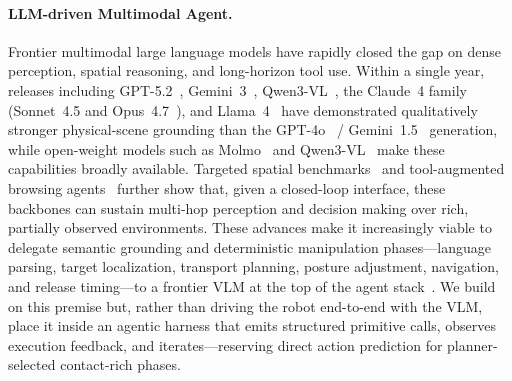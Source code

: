 \documentclass{article}
\begin{document}
	\paragraph{LLM-driven Multimodal Agent.} Frontier multimodal large language models have rapidly closed the gap on dense perception, spatial reasoning, and long-horizon tool use. Within a single year, releases including GPT-5.2~\citep{openai2025gpt52}, Gemini~3~\citep{pichai2025gemini3}, Qwen3-VL~\citep{bai2025qwen3vltechnicalreport}, the Claude~4 family (Sonnet~4.5 and Opus~4.7~\citep{anthropic2025claudesonnet45}), and Llama~4~\citep{llama4} have demonstrated qualitatively stronger physical-scene grounding than the GPT-4o~\citep{openai2024gpt4ocard} / Gemini~1.5~\citep{team2023gemini} generation, while open-weight models such as Molmo~\citep{deitke2025molmo} and Qwen3-VL~\citep{bai2025qwen3vltechnicalreport} make these capabilities broadly available. Targeted spatial benchmarks~\citep{chen2024spatialvlm} and tool-augmented browsing agents~\citep{oaidr, geminidr, wu2025mmsearchr1, geng2025webwatcher, huang2026vision, jin2025search, li2025websailor} further show that, given a closed-loop interface, these backbones can sustain multi-hop perception and decision making over rich, partially observed environments. These advances make it increasingly viable to delegate semantic grounding and deterministic manipulation phases---language parsing, target localization, transport planning, posture adjustment, navigation, and release timing---to a frontier VLM at the top of the agent stack~\citep{team2025gemini, geminirobotics1d52025, wang2023voyager}. We build on this premise but, rather than driving the robot end-to-end with the VLM, place it inside an agentic harness that emits structured primitive calls, observes execution feedback, and iterates---reserving direct action prediction for planner-selected contact-rich phases.
\end{document}
